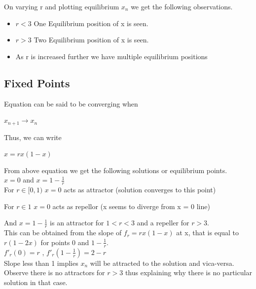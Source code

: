 \documentclass{report}
\begin{document}
On varying r and plotting equilibrium $x_{n}$ we get the following observations.

\begin{itemize}
  \item $r < 3$ One Equilibrium position of x is seen.
  \item $r > 3$ Two Equilibrium position of x is seen.
  \item As r is increased further we have multiple equilibrium positions
\end{itemize}

\subsection{Fixed Points}


Equation can be said to be converging when

$x_{n+1} \to x_n$

Thus, we can write

$x = rx(1-x)$

From above equation we get the following solutions or equilibrium points.\\

$x = 0$ and $x = 1 - \frac{1}{r}$\\

For $r \in [0,1)$ $x = 0$ acts as attractor (solution converges to this point)

For $r \in 1$ $x = 0$ acts as repellor (x seems to diverge from x = 0 line)

And $x = 1 - \frac{1}{r}$ is an attractor for $1 < r < 3$ and a repeller for $r > 3$.\\

This can be obtained from the slope of $f_r = rx(1-x)$ at x, that is equal to $r(1-2x)$ for points 0 and $1-\frac{1}{r}$.\\

$f'_r(0) = r$ , $f'_r(1-\frac{1}{r}) = 2-r$\\



Slope less than 1 implies $x_n$ will be attracted to the solution and vica-versa. Observe there is no attractors for $r>3$ thus explaining why there is no particular solution in that case.
\end{document}
